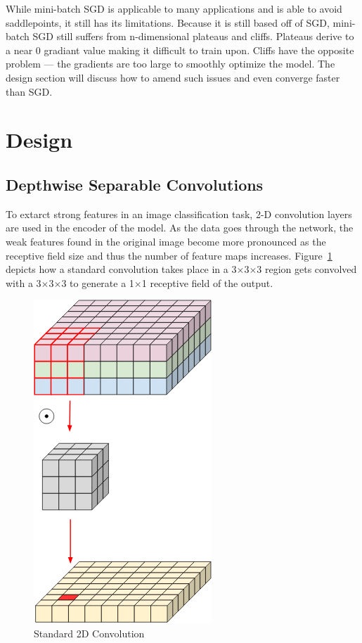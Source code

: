 \documentclass[conference]{IEEEtran}
\begin{document}
While mini-batch SGD is applicable to many applications and is able to avoid
saddlepoints, it still has its limitations. Because it is still based off of
SGD, mini-batch SGD still suffers from n-dimensional plateaus and cliffs.
Plateaus derive to a near 0 gradiant value making it difficult to train upon.
Cliffs have the opposite problem --- the gradients are too large to smoothly
optimize the model. The design section  will discuss how to amend such issues
and even converge faster than SGD\@.







\section{Design} %


\subsection{Depthwise Separable Convolutions}\label{subsec:depthwiseSeparableConvolutions} %

To extarct strong features in an image classification task, 2-D convolution
layers are used in the encoder of the model. As the data goes through the
network, the weak features found in the original image become more pronounced
as the receptive field size and thus the number of feature maps increases.
Figure~\ref{fig:standard2DConvolution} depicts how a standard convolution takes
place in a 3$\times$3$\times$3 region gets convolved with a 3$\times$3$\times$3
to generate a 1$\times$1 receptive field of the output.

\begin{figure}[H]
    \centering
    \includegraphics[height=50ex]{./figures/standardConvolution.png}
    \caption{Standard 2D Convolution~\cite{depthWiseConvolutionImages}}\label{fig:standard2DConvolution}
\end{figure}
\end{document}
